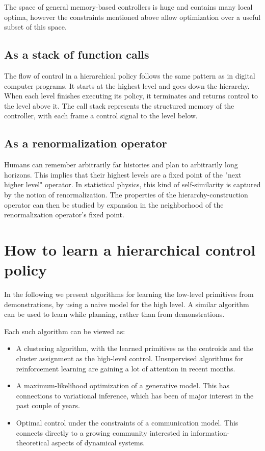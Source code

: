 The space of general memory-based controllers is huge and contains many local optima, however the constraints mentioned above allow optimization over a useful subset of this space.

\subsection{As a stack of function calls}

The flow of control in a hierarchical policy follows the same pattern as in digital computer programs.
It starts at the highest level and goes down the hierarchy.
When each level finishes executing its policy, it terminates and returns control to the level above it.
The call stack represents the structured memory of the controller, with each frame a control signal to the level below.

\subsection{As a renormalization operator}

Humans can remember arbitrarily far histories and plan to arbitrarily long horizons.
This implies that their highest levels are a fixed point of the "next higher level" operator.
In statistical physics, this kind of self-similarity is captured by the notion of renormalization.
The properties of the hierarchy-construction operator can then be studied by expansion in the neighborhood of the renormalization operator's fixed point.

\section{How to learn a hierarchical control policy}

In the following we present algorithms for learning the low-level primitives from demonstrations, by using a naive model for the high level.
A similar algorithm can be used to learn while planning, rather than from demonstrations.

Each such algorithm can be viewed as:

\begin{itemize}
	\item A clustering algorithm, with the learned primitives as the centroids and the cluster assignment as the high-level control.
		Unsupervised algorithms for reinforcement learning are gaining a lot of attention in recent months.
	\item A maximum-likelihood optimization of a generative model.
		This has connections to variational inference, which has been of major interest in the past couple of years.
	\item Optimal control under the constraints of a communication model.
		This connects directly to a growing community interested in information-theoretical aspects of dynamical systems.
\end{itemize}

